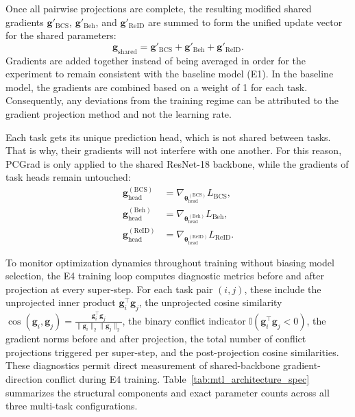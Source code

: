 Once all pairwise projections are complete, the resulting modified shared gradients $\mathbf{g}'_{\mathrm{BCS}}$, $\mathbf{g}'_{\mathrm{Beh}}$, and $\mathbf{g}'_{\mathrm{ReID}}$ are summed to form the unified update vector for the shared parameters:
\begin{equation}
 \mathbf{g}_{\mathrm{shared}} = \mathbf{g}'_{\mathrm{BCS}} + \mathbf{g}'_{\mathrm{Beh}} + \mathbf{g}'_{\mathrm{ReID}}.
\end{equation}
Gradients are added together instead of being averaged in order for the experiment to remain consistent with the baseline model (E1). In the baseline model, the gradients are combined based on a weight of 1 for each task. Consequently, any deviations from the training regime can be attributed to the gradient projection method and not the learning rate.

Each task gets its unique prediction head, which is not shared between tasks. That is why, their gradients will not interfere with one another. For this reason, PCGrad is only applied to the shared ResNet-18 backbone, while the gradients of task heads remain untouched:
\begin{align}
 \mathbf{g}_{\mathrm{head}}^{(\mathrm{BCS})} &= \nabla_{\boldsymbol{\theta}_{\mathrm{head}}^{(\mathrm{BCS})}} L_{\mathrm{BCS}}, \\
 \mathbf{g}_{\mathrm{head}}^{(\mathrm{Beh})} &= \nabla_{\boldsymbol{\theta}_{\mathrm{head}}^{(\mathrm{Beh})}} L_{\mathrm{Beh}}, \\
 \mathbf{g}_{\mathrm{head}}^{(\mathrm{ReID})} &= \nabla_{\boldsymbol{\theta}_{\mathrm{head}}^{(\mathrm{ReID})}} L_{\mathrm{ReID}}.
\end{align}

To monitor optimization dynamics throughout training without biasing model selection, the E4 training loop computes diagnostic metrics before and after projection at every super-step. For each task pair $(i, j)$, these include the unprojected inner product $\mathbf{g}_i^\top \mathbf{g}_j$, the unprojected cosine similarity $\cos(\mathbf{g}_i, \mathbf{g}_j) = \frac{\mathbf{g}_i^\top \mathbf{g}_j}{\lVert\mathbf{g}_i\rVert_2 \lVert\mathbf{g}_j\rVert_2}$, the binary conflict indicator $\mathbb{I}(\mathbf{g}_i^\top \mathbf{g}_j < 0)$, the gradient norms before and after projection, the total number of conflict projections triggered per super-step, and the post-projection cosine similarities. These diagnostics permit direct measurement of shared-backbone gradient-direction conflict during E4 training. Table~\ref{tab:mtl_architecture_spec} summarizes the structural components and exact parameter counts across all three multi-task configurations.

